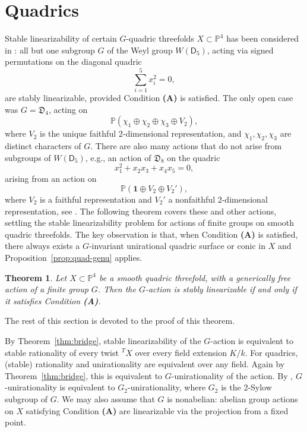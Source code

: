 \documentclass[12pt,reqno]{amsart}
\theoremstyle{plain}
\newtheorem{theo}[prop]{Theorem}
\theoremstyle{remark}
\theoremstyle{definition}
\numberwithin{equation}{section}
\def\bP{{\mathbb P}}
\begin{document}
\section{Quadrics}
\label{sect:quad}


Stable linearizability of certain $G$-quadric threefolds $X\subset \bP^4$ has been considered in \cite[Sections 5 and 6]{HT-quadric}: 
all but one subgroup $G$ of the Weyl group $W(\mathsf D_5)$, acting via signed permutations on the diagonal quadric 
$$
\sum_{i=1}^5 x_i^2=0, 
$$
are stably linearizable, provided Condition {\bf (A)} is satisfied. The only open case was $G=\mathfrak D_4$, acting on
$$
\bP(\chi_1\oplus \chi_2\oplus \chi_3\oplus V_2), 
$$
where $V_2$ is the unique faithful 2-dimensional representation, and $\chi_1,\chi_2,\chi_3$ are distinct characters of $G$. There are also many actions that do not arise from subgroups of 
$W(\mathsf D_5)$, e.g., an action of $\mathfrak D_8$ on the quadric 
$$
x_1^2+x_2x_3+x_4x_5=0, 
$$
arising from an action on 
$$
\bP(\mathbf 1 \oplus V_2\oplus V_2'),
$$
where $V_2$ is a faithful representation and $V_2'$ a nonfaithful 2-dimensional representation, see \cite[Remark 6.6]{HT-quadric}. 
The following theorem covers these and other actions, settling the stable linearizability problem for actions of finite groups on smooth quadric threefolds. The key observation is that, when Condition {\bf (A)} is satisfied, there always exists a $G$-invariant unirational quadric surface or conic in $X$ and Proposition~\ref{prop:quad-genu} applies.
 

\begin{theo} 
    \label{thm:quad-uni}
    Let $X\subset \bP^4$ be a smooth quadric threefold, with a generically free action of a finite group $G$. Then the $G$-action is stably linearizable if and only if it satisfies Condition {\bf (A)}.   
\end{theo}


The rest of this section is devoted to the proof of this theorem. 


By Theorem~\ref{thm:bridge}, stable linearizability of the $G$-action is equivalent to stable rationality of every twist ${}^TX$ over every field extension $K/k$. For quadrics, (stable) rationality and unirationality are equivalent over any field. Again by Theorem~\ref{thm:bridge}, this is equivalent to $G$-unirationality of the action. 
By \cite[Theorem 10.2]{DR}, $G$-unirationality  is equivalent to $G_2$-unirationality, where $G_2$ is the 2-Sylow subgroup of $G$. We may also assume that $G$ is nonabelian: abelian group actions on $X$ satisfying Condition {\bf(A)} are linearizable via the projection from a fixed point.
\end{document}
